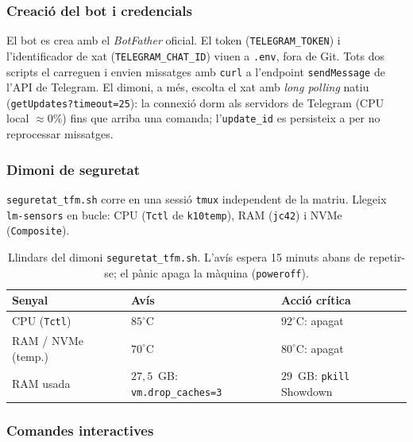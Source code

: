 \subsubsection{Creació del bot i credencials}

El bot es crea amb el \textit{BotFather} oficial. El token (\texttt{TELEGRAM\_TOKEN}) i l'identificador de xat (\texttt{TELEGRAM\_CHAT\_ID}) viuen a \texttt{.env}, fora de Git. Tots dos scripts el carreguen i envien missatges amb \texttt{curl} a l'endpoint \texttt{sendMessage} de l'API de Telegram. El dimoni, a més, escolta el xat amb \textit{long polling} natiu (\texttt{getUpdates?timeout=25}): la connexió dorm als servidors de Telegram (CPU local $\approx 0\%$) fins que arriba una comanda; l'\texttt{update\_id} es persisteix a  per no reprocessar missatges.

\subsubsection{Dimoni de seguretat}

\texttt{seguretat\_tfm.sh} corre en una sessió \texttt{tmux} independent de la matriu. Llegeix \texttt{lm-sensors} en bucle: CPU (\texttt{Tctl} de \texttt{k10temp}), RAM (\texttt{jc42}) i NVMe (\texttt{Composite}).

\begin{table}[htbp]
    \centering
    \caption{Llindars del dimoni \texttt{seguretat\_tfm.sh}. L'avís espera 15 minuts abans de repetir-se; el pànic apaga la màquina (\texttt{poweroff}).}
    \label{tab:telegram_thresholds_app}
    \small
    \begin{tabularx}{\textwidth}{lXX}
        \toprule
        \textbf{Senyal} & \textbf{Avís} & \textbf{Acció crítica} \\
        \midrule
        CPU (\texttt{Tctl}) & $85^\circ$C & $92^\circ$C: apagat \\
        \arrayrulecolor{gray!30}\hline\arrayrulecolor{black}
        RAM / NVMe (temp.) & $70^\circ$C & $80^\circ$C: apagat \\
        \arrayrulecolor{gray!30}\hline\arrayrulecolor{black}
        RAM usada & $27{,}5$~GB: \texttt{vm.drop\_caches=3} & $29$~GB: \texttt{pkill} Showdown \\
        \bottomrule
    \end{tabularx}
\end{table}

\subsubsection{Comandes interactives}

